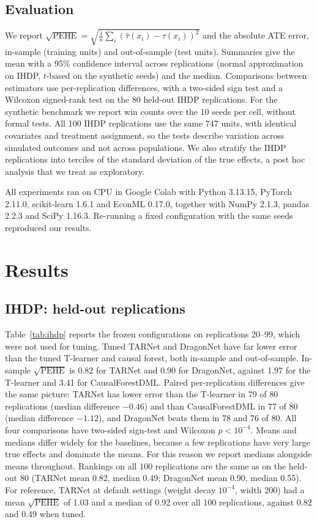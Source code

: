 \documentclass[10pt]{article}
\begin{document}
\subsection{Evaluation}

We report $\sqrt{\mathrm{PEHE}}=\sqrt{\tfrac1n\sum_i(\hat\tau(x_i)-\tau(x_i))^2}$ and the absolute ATE error, in-sample (training units) and out-of-sample (test units). Summaries give the mean with a 95\% confidence interval across replications (normal approximation on IHDP, $t$-based on the synthetic seeds) and the median. Comparisons between estimators use per-replication differences, with a two-sided sign test and a Wilcoxon signed-rank test on the 80 held-out IHDP replications. For the synthetic benchmark we report win counts over the 10 seeds per cell, without formal tests. All 100 IHDP replications use the same 747 units, with identical covariates and treatment assignment, so the tests describe variation across simulated outcomes and not across populations. We also stratify the IHDP replications into terciles of the standard deviation of the true effects, a post hoc analysis that we treat as exploratory.

All experiments ran on CPU in Google Colab with Python 3.13.15, PyTorch 2.11.0, scikit-learn 1.6.1 and EconML 0.17.0, together with NumPy 2.1.3, pandas 2.2.3 and SciPy 1.16.3. Re-running a fixed configuration with the same seeds reproduced our results.

\section{Results}

\subsection{IHDP: held-out replications}

Table~\ref{tab:ihdp} reports the frozen configurations on replications 20--99, which were not used for tuning. Tuned TARNet and DragonNet have far lower error than the tuned T-learner and causal forest, both in-sample and out-of-sample. In-sample $\sqrt{\mathrm{PEHE}}$ is 0.82 for TARNet and 0.90 for DragonNet, against 1.97 for the T-learner and 3.41 for CausalForestDML. Paired per-replication differences give the same picture: TARNet has lower error than the T-learner in 79 of 80 replications (median difference $-0.46$) and than CausalForestDML in 77 of 80 (median difference $-1.12$), and DragonNet beats them in 78 and 76 of 80. All four comparisons have two-sided sign-test and Wilcoxon $p<10^{-4}$. Means and medians differ widely for the baselines, because a few replications have very large true effects and dominate the means. For this reason we report medians alongside means throughout. Rankings on all 100 replications are the same as on the held-out 80 (TARNet mean 0.82, median 0.49; DragonNet mean 0.90, median 0.55).
For reference, TARNet at default settings (weight decay $10^{-4}$, width 200) had a mean $\sqrt{\mathrm{PEHE}}$ of 1.03 and a median of 0.92 over all 100 replications, against 0.82 and 0.49 when tuned.
\end{document}
